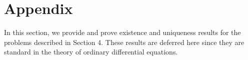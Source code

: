 \documentclass{article}
\newtheorem{prop}[thm]{Proposition}
\begin{document}
    \section{Appendix}
    In this section, we provide and prove existence and uniqueness results for the problems described in Section 4. These results are deferred here since they are standard in the theory of ordinary differential equations.
\end{document}
